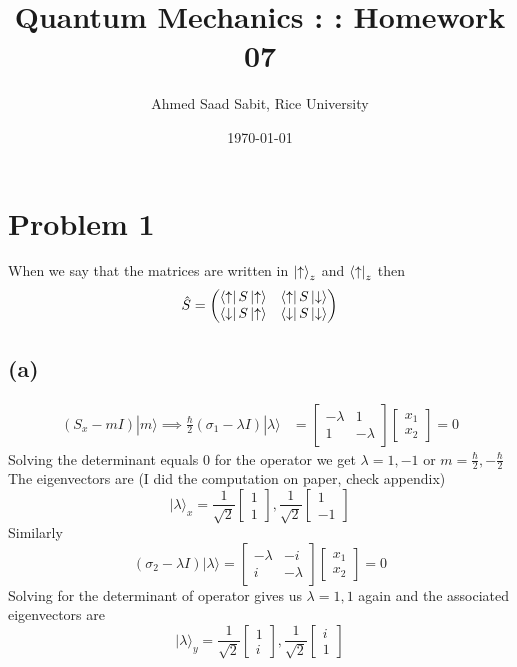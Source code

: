 \documentclass[letter, 10pts]{article}
\title{Quantum Mechanics : : Homework 07}
\author{Ahmed Saad Sabit, Rice University}
\date{\today}
\newcommand{\hb}{\hbar}
\newcommand{\U}{\uparrow}
\newcommand{\D}{\downarrow}
\begin{document}
\maketitle

\section*{Problem 1} 
When we say that the matrices are written in $\ket {\U}_z  $ and $\bra{\U}_z$ then 
\[
\hat{S} = 
\begin{pmatrix} 
	\bra{\U}S\ket{\U} & 
	\bra{\U}S\ket{\D} \\
	\bra{\D}S\ket{\U} & 
	\bra{\D}S\ket{\D} 
\end{pmatrix} 
\] 
\subsection*{(a)} 
\begin{align*}
	(S_x - m I) | m \rangle \implies \frac{\hb}{2} \left(\sigma_1 - \lambda I\right) | \lambda \rangle  &= 	\begin{bmatrix} - \lambda & 1 \\ 1 & - \lambda  \end{bmatrix}  
	\begin{bmatrix} x_1 \\ x_2 \end{bmatrix}  = 0 
\end{align*}
Solving the determinant equals $0$ for the operator we get $ \lambda = 1 ,-1$ or $m = \frac{\hb}{2}, -  \frac{\hb}{2}$
The eigenvectors are (I did the computation on paper, check appendix)
\[ | \lambda \rangle_x = 
\frac{1}{\sqrt{2} } \begin{bmatrix} 1\\1 \end{bmatrix} , 
\frac{1}{\sqrt{2} } \begin{bmatrix} 1 \\ - 1 \end{bmatrix} 
\] 
Similarly 
\[
	(\sigma_2 - \lambda I) | \lambda \rangle  = 
	\begin{bmatrix} - \lambda & - i \\ i & - \lambda \end{bmatrix}  
	\begin{bmatrix} x_1 \\ x_2 \end{bmatrix}  = 0
\] 
Solving for the determinant of operator gives us $\lambda = 1,1$ again and the associated eigenvectors are 
\[
| \lambda \rangle _y = \frac{1}{\sqrt{2} } \begin{bmatrix} 1 \\ i \end{bmatrix} , 
\frac{1}{\sqrt{2} } \begin{bmatrix} i \\ 1 \end{bmatrix} 
\] 
\end{document}
